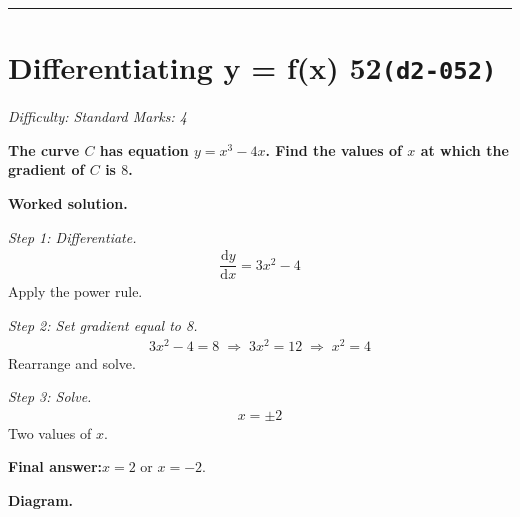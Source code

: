 \documentclass[11pt]{article}
\newcommand{\question}[1]{\par\medskip\noindent\textbf{#1}\par}
\begin{document}
\medskip\hrule

\section*{Differentiating y = f(x) 52\quad\small\texttt{(d2-052)}}
\textit{Difficulty: Standard \quad\textbar\quad Marks: 4}

\question{The curve \( C \) has equation \( y = x^3 - 4x \). Find the values of \( x \) at which the gradient of \( C \) is \( 8 \).}

\textbf{Worked solution.}

\textit{Step 1: Differentiate.}
\[\begin{gathered}
\dfrac{\mathrm{d}y}{\mathrm{d}x} = 3x^2 - 4
\end{gathered}\]
Apply the power rule.

\textit{Step 2: Set gradient equal to 8.}
\[\begin{gathered}
3x^2 - 4 = 8 \;\Rightarrow\; 3x^2 = 12 \;\Rightarrow\; x^2 = 4
\end{gathered}\]
Rearrange and solve.

\textit{Step 3: Solve.}
\[\begin{gathered}
x = \pm 2
\end{gathered}\]
Two values of \( x \).

\begin{answerbox}
\textbf{Final answer:}\quad \(\displaystyle  x = 2 \) or \(\displaystyle  x = -2 \).
\end{answerbox}
\textbf{Diagram.}
\end{document}
